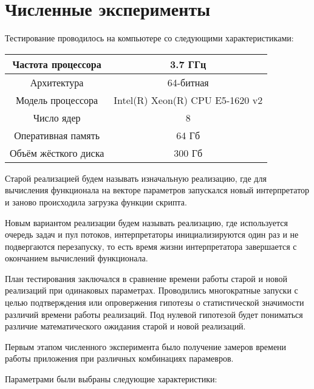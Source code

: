\section*{Численные эксперименты}

Тестирование проводилось на компьютере со следующими характеристиками:
\bigskip

\begin{tabular}{| c | c |}
    \hline
    Частота процессора & 3.7 ГГц \\ \hline
    Архитектура & 64-битная \\ \hline
    Модель процессора & Intel(R) Xeon(R) CPU E5-1620 v2 \\ \hline
    Число ядер & 8 \\ \hline
    Оперативная память & 64 Гб \\ \hline
    Объём жёсткого диска & 300 Гб \\
    \hline
\end{tabular}
\bigskip

Старой реализацией будем называть
изначальную реализацию,
где для вычисления функционала
на векторе параметров запускался
новый интерпретатор и
заново происходила загрузка
функции скрипта.

Новым вариантом реализации
будем называть реализацию,
где используется очередь задач
и пул потоков,
интерпретаторы инициализируются
один раз и не подвергаются перезапуску,
то есть время жизни интерпретатора
завершается с окончанием
вычислений функционала.

План тестирования заключался
в сравнение времени работы
старой и новой реализаций
при одинаковых параметрах.
Проводились многократные запуски
с целью подтверждения или опровержения
гипотезы о статистической значимости различий
времени работы реализаций.
Под нулевой гипотезой будет пониматься
различие математического ожидания
старой и новой реализаций.

Первым этапом численного эксперимента
было получение замеров времени
работы приложения
при различных комбинациях парамевров.

Параметрами были выбраны следующие характеристики:

